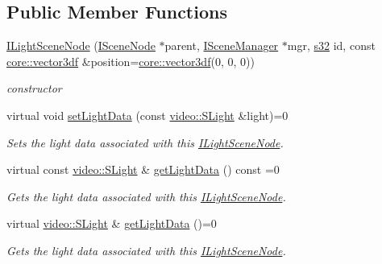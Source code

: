 \subsection*{Public Member Functions}
\begin{DoxyCompactItemize}
\item 
\mbox{\label{classirr_1_1scene_1_1ILightSceneNode_aa13c236d797d731c1035820a909ba961}} 
\hyperlink{classirr_1_1scene_1_1ILightSceneNode_aa13c236d797d731c1035820a909ba961}{I\+Light\+Scene\+Node} (\hyperlink{classirr_1_1scene_1_1ISceneNode}{I\+Scene\+Node} $\ast$parent, \hyperlink{classirr_1_1scene_1_1ISceneManager}{I\+Scene\+Manager} $\ast$mgr, \hyperlink{namespaceirr_ac66849b7a6ed16e30ebede579f9b47c6}{s32} id, const \hyperlink{namespaceirr_1_1core_a06f169d08b5c429f5575acb7edbad811}{core\+::vector3df} \&position=\hyperlink{namespaceirr_1_1core_a06f169d08b5c429f5575acb7edbad811}{core\+::vector3df}(0, 0, 0))
\begin{DoxyCompactList}\small\item\em constructor \end{DoxyCompactList}\item 
virtual void \hyperlink{classirr_1_1scene_1_1ILightSceneNode_acf74ff3400a26ae31eb96b9c479e62d5}{set\+Light\+Data} (const \hyperlink{structirr_1_1video_1_1SLight}{video\+::\+S\+Light} \&light)=0
\begin{DoxyCompactList}\small\item\em Sets the light data associated with this \hyperlink{classirr_1_1scene_1_1ILightSceneNode}{I\+Light\+Scene\+Node}. \end{DoxyCompactList}\item 
virtual const \hyperlink{structirr_1_1video_1_1SLight}{video\+::\+S\+Light} \& \hyperlink{classirr_1_1scene_1_1ILightSceneNode_a687813feae9312a86882e12c2bd10194}{get\+Light\+Data} () const =0
\begin{DoxyCompactList}\small\item\em Gets the light data associated with this \hyperlink{classirr_1_1scene_1_1ILightSceneNode}{I\+Light\+Scene\+Node}. \end{DoxyCompactList}\item 
virtual \hyperlink{structirr_1_1video_1_1SLight}{video\+::\+S\+Light} \& \hyperlink{classirr_1_1scene_1_1ILightSceneNode_a20147e049be1a4790346fd72b150b30c}{get\+Light\+Data} ()=0
\begin{DoxyCompactList}\small\item\em Gets the light data associated with this \hyperlink{classirr_1_1scene_1_1ILightSceneNode}{I\+Light\+Scene\+Node}. \end{DoxyCompactList}\item 

\end{DoxyCompactItemize}
